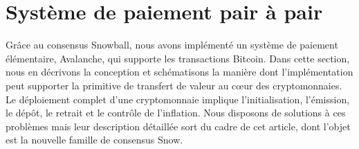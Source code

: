 \documentclass[letterpaper,twocolumn,10pt]{article}
\newcommand{\tronly}[2]{#1}
\theoremstyle{definition}
\begin{document}



\section{Système de paiement pair à pair}
\label{sec:implementation}


Grâce au consensus Snowball, nous avons implémenté un système de paiement élémentaire, Avalanche, qui supporte les transactions Bitcoin. Dans cette section, nous en décrivons la conception et schématisons la manière dont l'implémentation peut supporter la primitive de transfert de valeur au cœur des cryptomonnaies.
Le déploiement complet d'une cryptomonnaie implique l'initialisation, l'émission, le dépôt, le retrait et le contrôle de l'inflation. Nous disposons de solutions à ces problèmes mais leur description détaillée sort du cadre de cet article, dont l'objet est la nouvelle famille de consensus Snow. %
\end{document}
